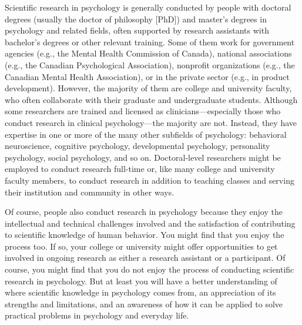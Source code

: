 
Scientific research in psychology is generally conducted by people with doctoral degrees (usually the doctor of philosophy [PhD]) and master's degrees in psychology and related fields, often supported by research assistants with bachelor's degrees or other relevant training. Some of them work for government agencies (e.g., the Mental Health Commission of Canada), national associations (e.g., the Canadian Psychological Association), nonprofit organizations (e.g., the Canadian Mental Health Association), or in the private sector (e.g., in product development). However, the majority of them are college and university faculty, who often collaborate with their graduate and undergraduate students. Although some researchers are trained and licensed as clinicians---especially those who conduct research in clinical psychology---the majority are not. Instead, they have expertise in one or more of the many other subfields of psychology: behavioral neuroscience, cognitive psychology, developmental psychology, personality psychology, social psychology, and so on. Doctoral-level researchers might be employed to conduct research full-time or, like many college and university faculty members, to conduct research in addition to teaching classes and serving their institution and community in other ways.

Of course, people also conduct research in psychology because they enjoy the intellectual and technical challenges involved and the satisfaction of contributing to scientific knowledge of human behavior. You might find that you enjoy the process too. If so, your college or university might offer opportunities to get involved in ongoing research as either a research assistant or a participant. Of course, you might find that you do not enjoy the process of conducting scientific research in psychology. But at least you will have a better understanding of where scientific knowledge in psychology comes from, an appreciation of its strengths and limitations, and an awareness of how it can be applied to solve practical problems in psychology and everyday life.


